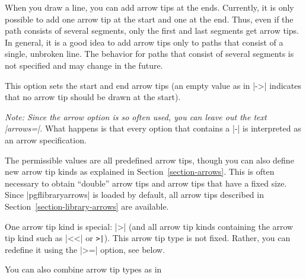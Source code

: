 When you draw a line, you can add arrow tips at the ends. Currently, it is
only possible to add one arrow tip at the start and one at the end. Thus,
even if the path consists of several segments, only the first and last
segments get arrow tips. In general, it is a good idea to add arrow tips only
to paths that consist of a single, unbroken line. The behavior for
paths that consist of several segments is not specified and may change
in the future.

\begin{itemize}
  This option sets the start and end arrow tips (an empty value as in |->|
  indicates that no arrow tip should be drawn at the start).%

  \emph{Note: Since the arrow option is so often used, you can leave
    out the text |arrows=|.} What happens is that every option that
  contains a |-| is interpreted as an arrow specification.

\begin{codeexample}[]
\end{codeexample}

  The permissible values are all predefined arrow tips, though
  you can also define new arrow tip kinds as explained in
  Section~\ref{section-arrows}. This is often necessary to obtain
  ``double'' arrow tips and arrow tips that have a fixed size. Since
  |pgflibraryarrows| is loaded by default, all arrow tips described in
  Section~\ref{section-library-arrows} are available.

  One arrow tip kind is special: |>| (and all arrow tip kinds containing the
  arrow tip kind such as |<<| or \verb!>|!). This arrow tip type is not  
  fixed. Rather, you can redefine it using the |>=| option, see
  below. 

  \example You can also combine arrow tip types as in
\begin{codeexample}[]
\begin{tikzpicture}[thick]
  \draw[to reversed-to]   (0,0) .. controls +(.5,0) and +(-.5,-.5) .. +(1.5,1);
  \draw[[-latex reversed] (1,0) .. controls +(.5,0) and +(-.5,-.5) .. +(1.5,1);
  \draw[latex-)]          (2,0) .. controls +(.5,0) and +(-.5,-.5) .. +(1.5,1);
  \useasboundingbox (-.1,-.1) rectangle (3.1,1.1); %
\end{tikzpicture}
\end{codeexample}


\end{itemize}

